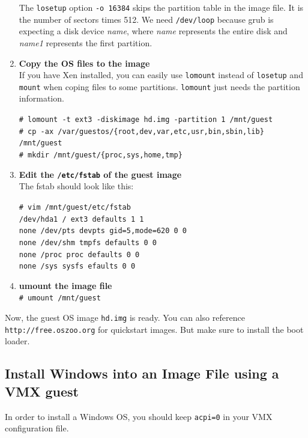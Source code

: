 \documentclass[11pt,twoside,final,openright]{report}
\begin{document}
\begin{enumerate}
The {\small {\tt losetup}} option {\small {\tt -o 16384}} skips the partition table in the image file. It is the number of sectors times 512. We need {\small {\tt /dev/loop}} because grub is expecting a disk device \emph{name}, where \emph{name} represents the entire disk and \emph{name1} represents the first partition.

\item {\bfseries Copy the OS files to the image}\\ 
If you have Xen installed, you can easily use {\small {\tt lomount}} instead of {\small {\tt losetup}} and {\small {\tt mount}} when coping files to some partitions. {\small {\tt lomount}} just needs the partition information.

{\scriptsize {\tt \# lomount -t ext3 -diskimage hd.img -partition 1 /mnt/guest\\
\# cp -ax /var/guestos/\{root,dev,var,etc,usr,bin,sbin,lib\} /mnt/guest\\
\# mkdir /mnt/guest/\{proc,sys,home,tmp\}}}

\item {\bfseries Edit the {\small {\tt /etc/fstab}} of the guest image}\\
The fstab should look like this:

{\scriptsize {\tt \# vim /mnt/guest/etc/fstab\\
/dev/hda1       /               ext3            defaults 1 1\\
none            /dev/pts        devpts  gid=5,mode=620 0 0\\
none            /dev/shm        tmpfs           defaults 0 0\\
none            /proc           proc            defaults 0 0\\
none            /sys            sysfs           efaults 0 0}}

\item {\bfseries umount the image file}\\
{\small {\tt \# umount /mnt/guest}}
\end{enumerate}

Now, the guest OS image {\small {\tt hd.img}} is ready. You can also reference {\small {\tt http://free.oszoo.org}} for quickstart images. But make sure to install the boot loader.

\subsection{Install Windows into an Image File using a VMX guest}
In order to install a Windows OS, you should keep {\small {\tt acpi=0}} in your VMX configuration file.
\end{document}
